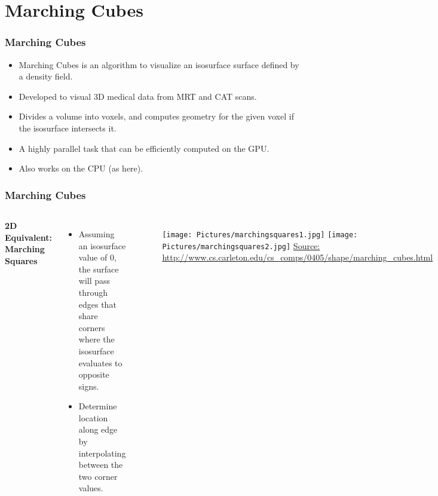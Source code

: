 \documentclass[12pt]{beamer}
\begin{document}
        \section{Marching Cubes}

        \begin{frame}
            \frametitle{Marching Cubes}
            \begin{itemize}
                \item Marching Cubes is an algorithm to visualize an isosurface surface defined by a density field.
                \item Developed to visual 3D medical data from MRT and CAT scans.
                \item Divides a volume into voxels, and computes geometry for the given voxel if the isosurface intersects it.
                \item A highly parallel task that can be efficiently computed on the GPU.
                \item Also works on the CPU (as here).
            \end{itemize}

        \end{frame}


        \begin{frame}
            \frametitle{Marching Cubes}
            \begin{columns}[c] %

                \textbf{2D Equivalent: Marching Squares}
                \begin{itemize}
                    \item Assuming an isosurface value of 0, the surface will pass through edges that share corners where the isosurface evaluates to opposite signs.
                    \item Determine location along edge by interpolating between the two corner values.
                \end{itemize}

                \begin{figure}
                    \texttt{[image: Pictures/marchingsquares1.jpg]}
                    \texttt{[image: Pictures/marchingsquares2.jpg]}
                    \tiny{\url{Source: http://www.cs.carleton.edu/cs_comps/0405/shape/marching_cubes.html}}

                \end{figure}

            \end{columns}
        \end{frame}
\end{document}
